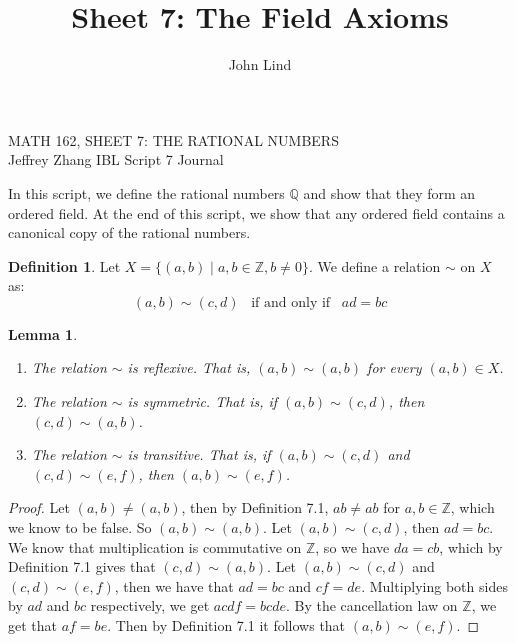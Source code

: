 \documentclass[12pt]{article}
\title{Sheet 7: The Field Axioms}
\author{John Lind}
\newcommand{\bbQ}{\mathbb{Q}}
\newcommand{\bbZ}{\mathbb{Z}}
\renewcommand{\_}[1]{\underline{ #1 }}
\newtheorem{lemma}[theorem]{Lemma}
\theoremstyle{definition}
\newtheorem{definition}[theorem]{Definition}
\numberwithin{equation}{subsection}
\begin{document}
\begin{center}
{\large MATH 162, SHEET 7: THE RATIONAL NUMBERS} \\ 
{Jeffrey Zhang IBL Script 7 Journal}
\end{center}

\bigskip \bigskip


\setcounter{section}{7}   

In this script, we define the rational numbers $\bbQ$
and show that they form an ordered field.  At the end of this
script, we show that any ordered field contains a canonical copy of the
rational numbers.


\begin{definition}  
Let $X=\{(a,b)\mid a,b\in\bbZ, b\neq 0\}$.  We define a relation $\sim$ on $X$ as:
$$(a,b)\sim (c,d)\hspace{10pt}\mbox{if and only if}\hspace{10pt}ad=bc$$
\end{definition}

\begin{lemma}  
\begin{enumerate}
\item
The relation $\sim$ is reflexive.  That is, $(a,b)\sim (a,b)$ for every $(a,b)\in X$.
\item
The relation $\sim$ is symmetric.  That is, if $(a,b)\sim (c,d)$, then $(c,d)\sim (a,b)$.
\item
The relation $\sim$ is transitive.  That is, if $(a,b)\sim (c,d)$ and $(c,d)\sim (e,f)$, then $(a,b)\sim (e,f)$.
\end{enumerate}
\end{lemma}  

\begin{proof}
Let $(a,b) \not= (a,b)$, then by Definition 7.1, $ab \not= ab$ for $a,b \in \bbZ$, which we know to be false. So $(a,b) \sim (a,b)$. \newline
Let $(a,b) \sim (c,d)$, then $ad = bc$. We know that multiplication is commutative on $\bbZ$, so we have $da = cb$, which by Definition 7.1 gives that $(c,d) \sim (a,b)$. \newline
Let $(a,b) \sim (c,d)$ and $(c,d) \sim (e,f)$, then we have that $ad = bc$ and $cf = de$.  Multiplying both sides by $ad$ and $bc$ respectively, we get $acdf = bcde$. By the cancellation law on $\bbZ$, we get that $af = be$. Then by Definition 7.1 it follows that $(a,b) \sim (e,f)$.
\end{proof}
\end{document}

